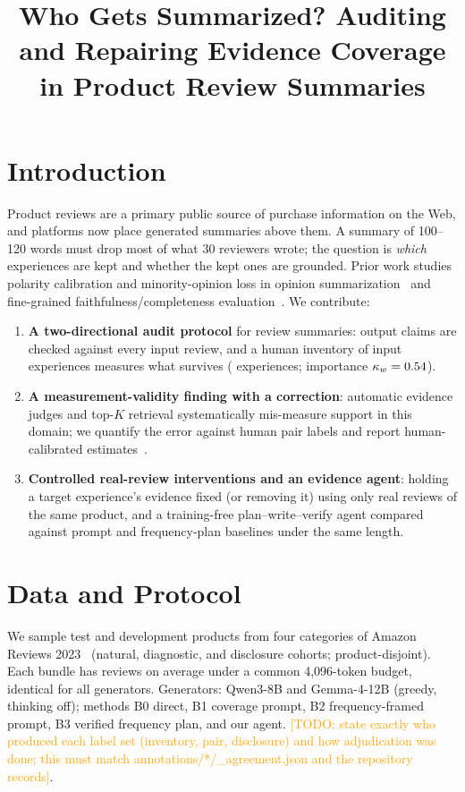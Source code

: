 \documentclass[sigconf,anonymous,review]{acmart}
\title{Who Gets Summarized? Auditing and Repairing Evidence Coverage in Product Review Summaries}
\newcommand{\todo}[1]{\textcolor{orange}{[TODO: #1]}}
\begin{document}
\maketitle

\section{Introduction}
Product reviews are a primary public source of purchase information on the Web, and platforms now
place generated summaries above them. A summary of 100--120 words must drop most of what 30 reviewers
wrote; the question is \emph{which} experiences are kept and whether the kept ones are grounded.
Prior work studies polarity calibration and minority-opinion loss in opinion summarization~\cite{poca2024,refer2025}
and fine-grained faithfulness/completeness evaluation~\cite{finesure2024}. We contribute:
\begin{enumerate}
\item \textbf{A two-directional audit protocol} for review summaries: output claims are checked against
every input review, and a human inventory of input experiences measures what survives
(\nGoldExperiences{} experiences; importance $\kappa_w=0.54$).
\item \textbf{A measurement-validity finding with a correction}: automatic evidence judges and top-$K$
retrieval systematically mis-measure support in this domain; we quantify the error against human pair
labels and report human-calibrated estimates~\cite{rogan1978,angelopoulos2023ppi}.
\item \textbf{Controlled real-review interventions and an evidence agent}: holding a target experience's
evidence fixed (or removing it) using only real reviews of the same product, and a training-free
plan--write--verify agent compared against prompt and frequency-plan baselines under the same length.
\end{enumerate}

\section{Data and Protocol}
We sample \nTestProducts{} test and \nDevProducts{} development products from four categories of Amazon
Reviews 2023~\cite{hou2024bridging} (natural, diagnostic, and disclosure cohorts; product-disjoint).
Each bundle has \reviewsPerBundle{} reviews on average under a common 4{,}096-token budget, identical
for all generators. Generators: Qwen3-8B and Gemma-4-12B (greedy, thinking off); methods B0 direct,
B1 coverage prompt, B2 frequency-framed prompt, B3 verified frequency plan, and our agent.
\todo{state exactly who produced each label set (inventory, pair, disclosure) and how adjudication was
done; this must match annotations/*/\_agreement.json and the repository records}.
\end{document}
